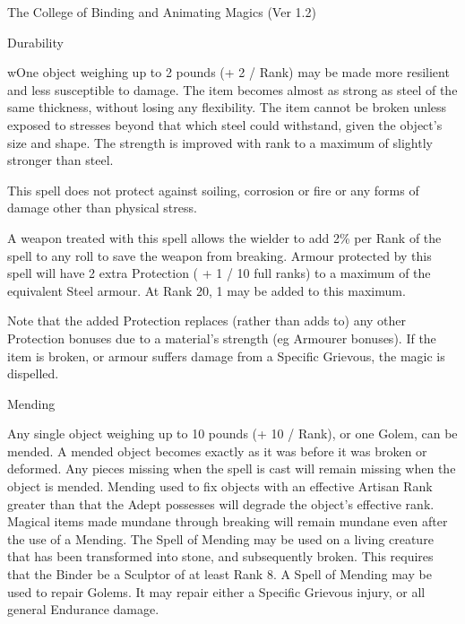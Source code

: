 \begin{Chapter}{The College of Binding and Animating Magics (Ver 1.2)}
\begin{spell}[G-4]{Durability }
\begin{effects}
wOne object weighing up to 2 pounds (+ 2 / Rank) may be made more
resilient and less susceptible to damage.  The item becomes almost as
strong as steel of the same thickness, without losing any flexibility.
The item cannot be broken unless exposed to stresses beyond that which
steel could withstand, given the object’s size and shape.  The
strength is improved with rank to a maximum of slightly stronger than
steel.

This spell does not protect against soiling, corrosion or fire or any
forms of damage other than physical stress.

A weapon treated with this spell allows the wielder to add 2\% per
Rank of the spell to any roll to save the weapon from breaking.
Armour protected by this spell will have 2 extra Protection ( + 1 / 10
full ranks) to a maximum of the equivalent Steel armour.  At Rank 20,
1 may be added to this maximum.

Note that the added Protection replaces (rather than adds to) any
other Protection bonuses due to a material’s strength (eg Armourer
bonuses).  If the item is broken, or armour suffers damage from a
Specific Grievous, the magic is dispelled.
\end{effects}
\end{spell}

\begin{spell}[G-5]{Mending }

\begin{effects}
Any single object weighing up to 10 pounds (+ 10 / Rank), or one
Golem, can be mended.  A mended object becomes exactly as it was
before it was broken or deformed. Any pieces missing when the spell is
cast will remain missing when the object is mended.  Mending used to
fix objects with an effective Artisan Rank greater than that the Adept
possesses will degrade the object’s effective rank.  Magical items
made mundane through breaking will remain mundane even after the use
of a Mending.  The Spell of Mending may be used on a living creature
that has been transformed into stone, and subsequently broken.  This
requires that the Binder be a Sculptor of at least Rank 8.  A Spell of
Mending may be used to repair Golems.  It may repair either a Specific
Grievous injury, or all general Endurance damage.
\end{effects}
\end{spell}


\end{Chapter}
